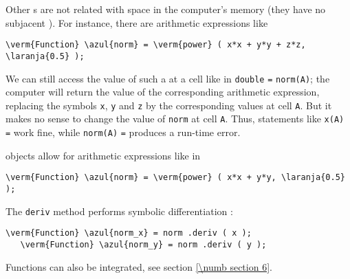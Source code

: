 Other {\small\tt{}}s are not related with space in the computer's memory
(they have no subjacent {\small\tt{}}).
For instance, there are arithmetic expressions like 

\begin{Verbatim}[commandchars=\\\{\},formatcom=\small\tt,baselinestretch=0.94]
   \verm{Function} \azul{norm} = \verm{power} ( x*x + y*y + z*z, \laranja{0.5} );
\end{Verbatim}

We can still access the value of such a {\small\tt{}} at a cell like in
{\small\tt double} {\small\tt{}} {\small\tt =} {\small\tt norm(A)};
the computer will return the value of the corresponding arithmetic expression,
replacing the symbols {\small\tt x}, {\small\tt y} and {\small\tt z} by the corresponding
values at cell {\small\tt A}.
But it makes no sense to change the value of {\small\tt norm} at cell {\small\tt A}.
Thus, statements like {\small\tt x(A)} {\small\tt =} {\small\tt{}} work fine,
while {\small\tt norm(A)} {\small\tt =} {\small\tt{}} produces a run-time error.

{\small\tt{}} objects allow for arithmetic expressions like in

\begin{Verbatim}[commandchars=\\\{\},formatcom=\small\tt,
   baselinestretch=0.94,framesep=2mm                     ]
   \verm{Function} \azul{norm} = \verm{power} ( x*x + y*y, \laranja{0.5} );
\end{Verbatim}

The {\small\tt deriv} method performs symbolic differentiation :

\begin{Verbatim}[commandchars=\\\{\},formatcom=\small\tt,
   baselinestretch=0.94,framesep=2mm                     ]
   \verm{Function} \azul{norm_x} = norm .deriv ( x );
   \verm{Function} \azul{norm_y} = norm .deriv ( y );
\end{Verbatim}

Functions can also be integrated, see section \ref{\numb section 6}.


